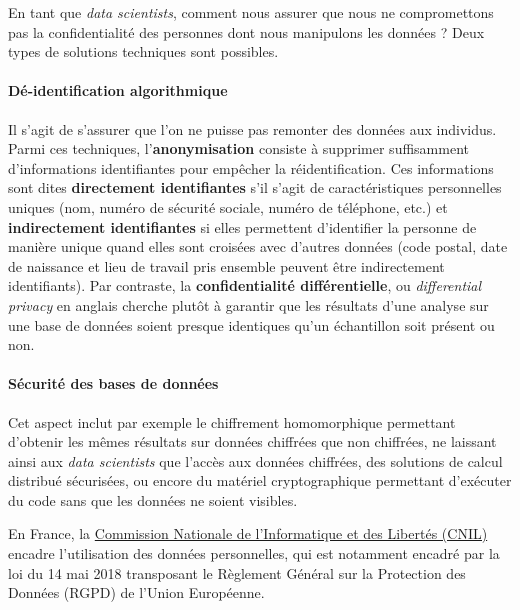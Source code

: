 En tant que \textit{data scientists}, comment nous assurer que nous ne
compromettons pas la confidentialité des personnes dont nous manipulons les
données ? Deux types de solutions techniques sont possibles.
\paragraph{Dé-identification algorithmique} Il s'agit de s'assurer que l'on ne
puisse pas remonter des données aux individus. Parmi ces techniques,
l'\textbf{anonymisation} consiste à supprimer suffisamment d'informations
identifiantes pour empêcher la réidentification. Ces informations sont dites
\textbf{directement identifiantes} s'il s'agit de caractéristiques personnelles
uniques (nom, numéro de sécurité sociale, numéro de téléphone, etc.) et
\textbf{indirectement identifiantes} si elles permettent d'identifier la
personne de manière unique quand elles sont croisées avec d'autres données
(code postal, date de naissance et lieu de travail pris ensemble peuvent être
indirectement identifiants).  Par contraste, la \textbf{confidentialité
  différentielle}, ou \textit{differential privacy} en anglais cherche plutôt à
garantir que les résultats d'une analyse sur une base de données soient presque
identiques qu'un échantillon soit présent ou non.

\paragraph{Sécurité des bases de données} Cet aspect inclut par exemple le
chiffrement homomorphique permettant d'obtenir les mêmes résultats sur données
chiffrées que non chiffrées, ne laissant ainsi aux \textit{data scientists} que
l'accès aux données chiffrées, des solutions de calcul distribué sécurisées, ou
encore du matériel cryptographique permettant d'exécuter du code sans que les
données ne soient visibles.

En France, la \href{https://www.cnil.fr/}{Commission Nationale de
  l'Informatique et des Libertés (CNIL)} encadre l'utilisation des données
personnelles, qui est notamment encadré par la loi du 14 mai 2018 transposant
le Règlement Général sur la Protection des Données (RGPD) de l'Union
Européenne.


